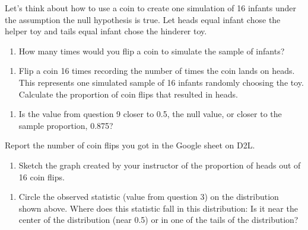 \documentclass[
]{report}
\providecommand{\tightlist}{%
  \setlength{\itemsep}{0pt}\setlength{\parskip}{0pt}}
\begin{document}
Let's think about how to use a coin to create one simulation of 16 infants under the assumption the null hypothesis is true. Let heads equal infant chose the helper toy and tails equal infant chose the hinderer toy.

\begin{enumerate}
\def\labelenumi{\arabic{enumi}.}
\setcounter{enumi}{9}
\tightlist
\item
  How many times would you flip a coin to simulate the sample of infants?
\end{enumerate}

\vspace{0.2in}

\begin{enumerate}
\def\labelenumi{\arabic{enumi}.}
\setcounter{enumi}{10}
\tightlist
\item
  Flip a coin 16 times recording the number of times the coin lands on heads. This represents one simulated sample of 16 infants randomly choosing the toy. Calculate the proportion of coin flips that resulted in heads.
\end{enumerate}

\vspace{0.2in}

\begin{enumerate}
\def\labelenumi{\arabic{enumi}.}
\setcounter{enumi}{11}
\tightlist
\item
  Is the value from question 9 closer to 0.5, the null value, or closer to the sample proportion, 0.875?
\end{enumerate}

\vspace{0.2in}

Report the number of coin flips you got in the Google sheet on D2L.

\begin{enumerate}
\def\labelenumi{\arabic{enumi}.}
\setcounter{enumi}{12}
\tightlist
\item
  Sketch the graph created by your instructor of the proportion of heads out of 16 coin flips.
\end{enumerate}

\vspace{2in}

\begin{enumerate}
\def\labelenumi{\arabic{enumi}.}
\setcounter{enumi}{13}
\tightlist
\item
  Circle the observed statistic (value from question 3) on the distribution shown above. Where does this statistic fall in this distribution: Is it near the center of the distribution (near 0.5) or in one of the tails of the distribution?
\end{enumerate}
\end{document}
